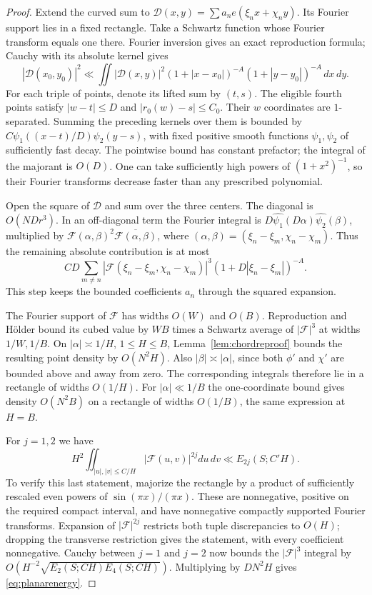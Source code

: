 \documentclass[11pt]{amsart}
\numberwithin{equation}{section}
\begin{document}
\begin{proof}
Extend the curved sum to
$\mathcal D(x,y)=\sum a_ne(\xi_nx+\chi_ny)$.
Its Fourier support lies in a fixed rectangle. Take a Schwartz function
whose Fourier transform equals one there. Fourier inversion gives an
exact reproduction formula; Cauchy with its absolute kernel gives
\[
 |\mathcal D(x_0,y_0)|^2
 \ll\iint |\mathcal D(x,y)|^2
 (1+|x-x_0|)^{-A}(1+|y-y_0|)^{-A}\,dx\,dy.
\]
For each triple of points, denote its lifted sum by $(t,s)$.
The eligible fourth points satisfy $|w-t|\le D$ and
$|r_0(w)-s|\le C_0$. Their $w$ coordinates are $1$-separated.
Summing the preceding kernels over them is bounded by
$C\psi_1((x-t)/D)\psi_2(y-s)$, with fixed positive smooth functions
$\psi_1,\psi_2$ of sufficiently fast decay. The pointwise bound has constant prefactor; the integral of the majorant is $O(D)$.
One can take sufficiently high powers of $(1+x^2)^{-1}$, so their
Fourier transforms decrease faster than any prescribed polynomial.

Open the square of $\mathcal D$ and sum over the three centers. The diagonal
is $O(NDr^3)$. In an off-diagonal term the Fourier integral is
$D\widehat{\psi_1}(D\alpha)\widehat{\psi_2}(\beta)$, multiplied by
$\mathcal F(\alpha,\beta)^2\overline{\mathcal F(\alpha,\beta)}$, where
$(\alpha,\beta)=(\xi_n-\xi_m,\chi_n-\chi_m)$.
Thus the remaining absolute contribution is at most
\[
 CD\sum_{m\ne n}|\mathcal F(\xi_n-\xi_m,\chi_n-\chi_m)|^3
                      (1+D|\xi_n-\xi_m|)^{-A}.
\]
This step keeps the bounded coefficients $a_n$ through the squared expansion.

The Fourier support of $\mathcal F$ has widths $O(W)$ and $O(B)$.
Reproduction and H\"older bound its cubed value by $WB$ times a
Schwartz average of $|\mathcal F|^3$ at widths $1/W,1/B$.
On $|\alpha|\asymp1/H$, $1\le H\le B$,
Lemma~\ref{lem:chordreproof} bounds the resulting point density by
$O(N^2H)$. Also $|\beta|\asymp|\alpha|$, since both $\phi'$ and
$\chi'$ are bounded above and away from zero. The corresponding
integrals therefore lie in a rectangle of widths $O(1/H)$.
For $|\alpha|\ll1/B$ the one-coordinate bound gives density
$O(N^2B)$ on a rectangle of widths $O(1/B)$, the same expression
at $H=B$.

For $j=1,2$ we have
\[
 H^2\iint_{|u|,|v|\le C/H}|\mathcal F(u,v)|^{2j}du\,dv
 \ll E_{2j}(S;C'H).
\]
To verify this last statement, majorize the rectangle by a product of
sufficiently rescaled even powers of $\sin(\pi x)/(\pi x)$.
These are nonnegative, positive on the required compact interval,
and have nonnegative compactly supported Fourier transforms.
Expansion of $|\mathcal F|^{2j}$ restricts both tuple discrepancies to $O(H)$;
dropping the transverse restriction gives the statement, with every
coefficient nonnegative. Cauchy between $j=1$ and $j=2$ now bounds
the $|\mathcal F|^3$ integral by
$O(H^{-2}\sqrt{E_2(S;CH)E_4(S;CH)})$.
Multiplying by $DN^2H$ gives \eqref{eq:planarenergy}.


\end{proof}
\end{document}

